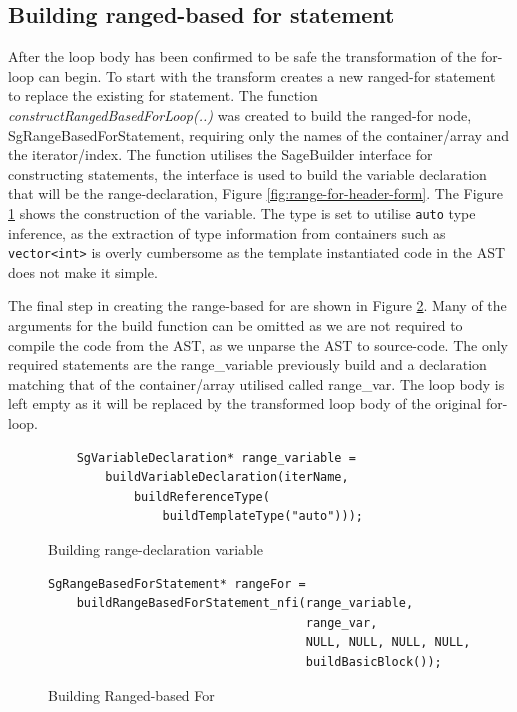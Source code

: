 \documentclass[bsc,frontabs,singlespacing,twoside,parskip,deptreport]{infthesis}
\begin{document}

\subsection{Building ranged-based for statement}\label{sec:build-range-for}
After the loop body has been confirmed to be safe the transformation of the for-loop can begin. To start with the transform creates a new ranged-for statement to replace the existing for statement. The function \textit{constructRangedBasedForLoop(..)} was created to build the ranged-for node, SgRangeBasedForStatement, requiring only the names of the container/array and the iterator/index. The function utilises the SageBuilder interface for constructing statements, the interface is used to build the variable declaration that will be the range-declaration, Figure \ref{fig:range-for-header-form}. The Figure \ref{fig:range-dec-var} shows the construction of the variable. The type is set to utilise \texttt{auto} type inference, as the extraction of type information from containers such as \texttt{vector<int>} is overly cumbersome as the template instantiated code in the AST does not make it simple. 

The final step in creating the range-based for are shown in Figure \ref{fig:range-based-for-stmt}. Many of the arguments for the build function can be omitted as we are not required to compile the code from the AST, as we unparse the AST to source-code. The only required statements are the range\_variable previously build and a declaration matching that of the container/array utilised called range\_var. The loop body is left empty as it will be replaced by the transformed loop body of the original for-loop.

\begin{figure}[H]
    \centering
    \begin{verbatim}
    SgVariableDeclaration* range_variable =
        buildVariableDeclaration(iterName, 
            buildReferenceType(
                buildTemplateType("auto"))); 
    \end{verbatim}
    \caption{Building range-declaration variable}
    \label{fig:range-dec-var}
\end{figure}

\begin{figure}[H]
    \centering
    \begin{verbatim}
SgRangeBasedForStatement* rangeFor =
    buildRangeBasedForStatement_nfi(range_variable,
                                    range_var,
                                    NULL, NULL, NULL, NULL,
                                    buildBasicBlock());    
    \end{verbatim}
    \caption{Building Ranged-based For}
    \label{fig:range-based-for-stmt}
\end{figure}
\end{document}
